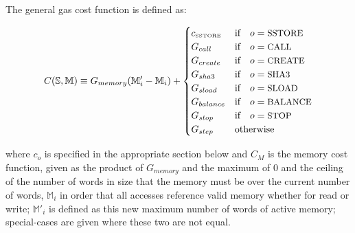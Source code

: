 \documentclass[9pt,oneside]{amsart}
\begin{document}
The general gas cost function is defined as:

\begin{equation}
C(\mathbb{S}, \mathbb{M}) \equiv G_{memory}(\mathbb{M}'_i - \mathbb{M}_i) + \begin{cases}
c_\text{\tiny SSTORE} & \text{if} \quad o = \text{\small SSTORE} \\
G_{call} & \text{if} \quad o = \text{\small CALL}\\
G_{create} & \text{if} \quad o = \text{\small CREATE}\\
G_{sha3} & \text{if} \quad o = \text{\small SHA3}\\
G_{sload} & \text{if} \quad o = \text{\small SLOAD}\\
G_{balance} & \text{if} \quad o = \text{\small BALANCE}\\
G_{stop} & \text{if} \quad o = \text{\small STOP}\\
G_{step} & \text{otherwise}
\end{cases}
\end{equation}

where $c_o$ is specified in the appropriate section below and $C_M$ is the memory cost function, given as the product of $G_{memory}$ and the maximum of 0 and the ceiling of the number of words in size that the memory must be over the current number of words, $\mathbb{M}_i$ in order that all accesses reference valid memory whether for read or write; $\mathbb{M}'_i$ is defined as this new maximum number of words of active memory; special-cases are given where these two are not equal.
\end{document}
